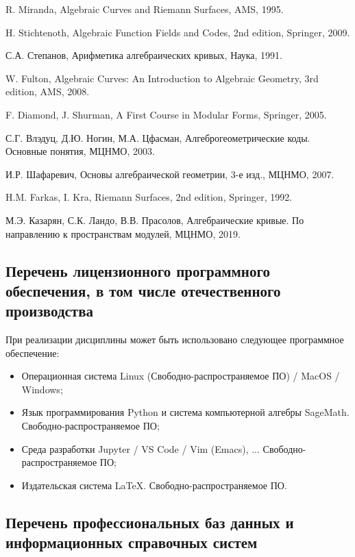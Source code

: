 \documentclass[a4paper, 12pt]{article}
\begin{document}
\begin{thebibliography}{Stich}

R. Miranda, Algebraic Curves and Riemann Surfaces, AMS, 1995.

H. Stichtenoth, Algebraic Function Fields and Codes, 2nd edition, Springer, 2009.

С.А. Степанов, Арифметика алгебраических кривых, Наука, 1991.

W. Fulton, Algebraic Curves: An Introduction to Algebraic Geometry, 3rd edition, AMS, 2008.

F. Diamond, J. Shurman, A First Course in Modular Forms, Springer, 2005.

С.Г. Влэдуц, Д.Ю. Ногин, М.А. Цфасман, Алгеброгеометрические коды. Основные понятия, МЦНМО, 2003.

И.Р. Шафаревич, Основы алгебраической геометрии, 3-е изд., МЦНМО, 2007.

H.M. Farkas, I. Kra, Riemann Surfaces, 2nd edition, Springer, 1992.

М.Э. Казарян, С.К. Ландо, В.В. Прасолов, Алгебраические кривые. По направлению к пространствам модулей, МЦНМО, 2019.

\end{thebibliography}

\subsection{Перечень лицензионного программного обеспечения, в том числе отечественного производства}

При реализации дисциплины может быть использовано следующее программное обеспечение:
\begin{itemize}
    \item Операционная система Linux (Свободно-распространяемое ПО) / MacOS / Windows;
    \item Язык программирования Python и система компьютерной алгебры SageMath. Свободно-распространяемое ПО;
    \item Среда разработки Jupyter / VS Code / Vim (Emacs), ... Свободно-распространяемое ПО;
    \item Издательская система LaTeX. Свободно-распространяемое ПО.
\end{itemize}

\subsection{Перечень профессиональных баз данных и информационных справочных систем}
\end{document}
